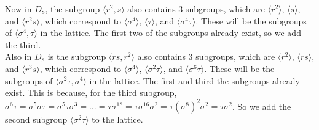 \documentclass{article}
\begin{document}
    Now in $D_8$,
    the subgroup $\langle r^2, s  \rangle$
    also contains 3 subgroups,
    which are $\langle r^2 \rangle$,
    $\langle s \rangle$,
    and $\langle r^2s \rangle$,
    which correspond to
    $\langle \sigma^4 \rangle$,
    $\langle \tau \rangle$,
    and $\langle \sigma^4\tau \rangle$.
    These will be the subgroups of
    $\langle \sigma^4, \tau \rangle$ in the lattice.
    The first two of the subgroups already exist,
    so we add the third. \\
    Also in $D_8$ is the subgroup $\langle rs, r^2  \rangle$
    also contains 3 subgroups,
    which are $\langle r^2 \rangle$,
    $\langle rs \rangle$,
    and $\langle r^3s \rangle$,
    which correspond to
    $\langle \sigma^4 \rangle$,
    $\langle \sigma^2\tau \rangle$,
    and $\langle \sigma^6\tau \rangle$.
    These will be the subgroups of
    $\langle \sigma^2\tau, \sigma^4 \rangle$ in the lattice.
    The first and third the subgroups already exist.
    This is because, for the third subgroup,
    $\sigma^6\tau = \sigma^{5}\sigma\tau = \sigma^5\tau\sigma^3 = \dots
    = \tau\sigma^{18} = \tau\sigma^{16}\sigma^2
    = \tau(\sigma^{8})^2\sigma^2 = \tau\sigma^2$.
    So we add the second subgroup $\langle \sigma^2\tau \rangle$
    to the lattice.
\end{document}
